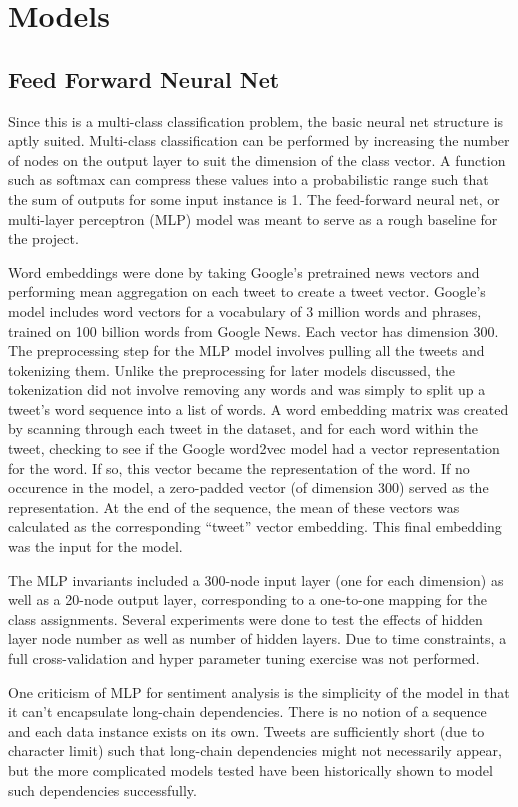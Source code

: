 \documentclass[11pt,a4paper]{article}
\begin{document}
	
	\section{Models}
	
	\subsection{Feed Forward Neural Net}
	Since this is a multi-class classification problem, the basic neural net structure is aptly suited. Multi-class classification can be performed by increasing the number of nodes on the output layer to suit the dimension of the class vector. A function such as softmax can compress these values into a probabilistic range such that the sum of outputs for some input instance is 1. The feed-forward neural net, or multi-layer perceptron (MLP) model was meant to serve as a rough baseline for the project.
	\par
	Word embeddings were done by taking Google’s pretrained news vectors and performing mean aggregation on each tweet to create a tweet vector. Google’s model includes word vectors for a vocabulary of 3 million words and phrases, trained on 100 billion words from Google News. Each vector has dimension 300. The preprocessing step for the MLP model involves pulling all the tweets and tokenizing them. Unlike the preprocessing for later models discussed, the tokenization did not involve removing any words and was simply to split up a tweet’s word sequence into a list of words. A word embedding matrix was created by scanning through each tweet in the dataset, and for each word within the tweet, checking to see if the Google word2vec model had a vector representation for the word. If so, this vector became the representation of the word. If no occurence in the model, a zero-padded vector (of dimension 300) served as the representation. At the end of the sequence, the mean of these vectors was calculated as the corresponding “tweet” vector embedding. This final embedding was the input for the model.
	\par
	The MLP invariants included a 300-node input layer (one for each dimension) as well as a 20-node output layer, corresponding to a one-to-one mapping for the class assignments. Several experiments were done to test the effects of hidden layer node number as well as number of hidden layers. Due to time constraints, a full cross-validation and hyper parameter tuning exercise was not performed. 
	\par
	One criticism of MLP for sentiment analysis is the simplicity of the model in that it can’t encapsulate long-chain dependencies. There is no notion of a sequence and each data instance exists on its own. Tweets are sufficiently short (due to character limit) such that long-chain dependencies might not necessarily appear, but the more complicated models tested have been historically shown to model such dependencies successfully. 
	
\end{document}
